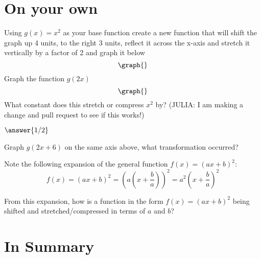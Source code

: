 \documentclass{ximera}
\begin{document}
\section{On your own}
\begin{question}
Using $g(x) = x^2$ as your base function create a new function that will shift the graph up 4 units, to the right 3 units, reflect it across the x-axis and stretch it vertically by a factor of 2 and graph it below
\[
\graph{}
\]
Graph the function $g(2x)$
\[
\graph{}
\]
What constant does this stretch or compress $x^2$ by? (JULIA: I am making a change and pull request to see if this works!)

$\answer{1/2}$

Graph $g(2x+6)$ on the same axis above, what transformation occurred?
\begin{freeResponse}
\end{freeResponse}
Note the following expansion of the general function $f(x)=(ax+b)^2$: $$\displaystyle f(x)=\left(ax+b\right)^2=\left(a\left(x+\frac{b}{a}\right)\right)^2=a^2\left(x+\frac{b}{a}\right)^2$$

From this expansion, how is a function in the form $f(x)=(ax+b)^2$ being shifted and stretched/compressed in terms of $a$ and $b$?
\begin{freeResponse}
\end{freeResponse}

\end{question}
\section{In Summary}
\end{document}
